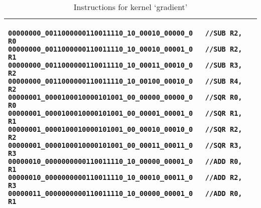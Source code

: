 \begin{table}[H]
	\centering
	\caption{Instructions for kernel `gradient'}
	\label{instruction_gradient}	
	\begin{tabular}{l}
	\toprule
	\begin{lstlisting}
00000000_0011000000110011110_10_00010_00000_0	//SUB R2, R0
00000000_0011000000110011110_10_00010_00001_0	//SUB R2, R1
00000000_0011000000110011110_10_00011_00010_0	//SUB R3, R2
00000000_0011000000110011110_10_00100_00010_0	//SUB R4, R2
00000001_0000100010000101001_00_00000_00000_0	//SQR R0, R0
00000001_0000100010000101001_00_00001_00001_0	//SQR R1, R1
00000001_0000100010000101001_00_00010_00010_0	//SQR R2, R2
00000001_0000100010000101001_00_00011_00011_0	//SQR R3, R3
00000010_0000000000110011110_10_00000_00001_0	//ADD R0, R1
00000010_0000000000110011110_10_00010_00011_0	//ADD R2, R3
00000011_0000000000110011110_10_00000_00001_0	//ADD R0, R1
	\end{lstlisting}
	\\ \bottomrule	
\end{tabular}
\end{table} 